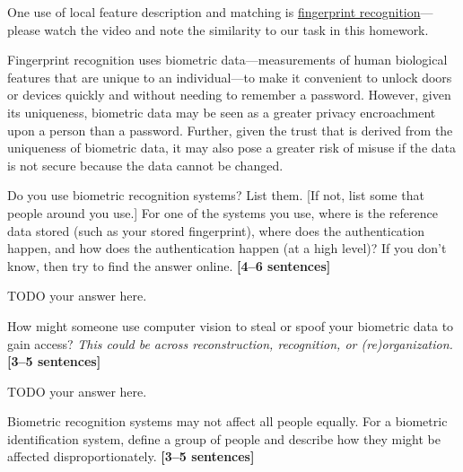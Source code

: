 \documentclass{csci1430}
\begin{document}
\begin{question}[points=9,drawbox=false] 
One use of local feature description and matching is \href{https://youtu.be/xD88Qs_DZp4?t=11}{fingerprint recognition}---please watch the video and note the similarity to our task in this homework. 

Fingerprint recognition uses biometric data---measurements of human biological features that are unique to an individual---to make it convenient to unlock doors or devices quickly and without needing to remember a password. However, given its uniqueness, biometric data may be seen as a greater privacy encroachment upon a person than a password. Further, given the trust that is derived from the uniqueness of biometric data, it may also pose a greater risk of misuse if the data is not secure because the data cannot be changed.
\end{question}

\begin{subquestion}[points=3]
Do you use biometric recognition systems? List them. [If not, list some that people around you use.]
For one of the systems you use, where is the reference data stored (such as your stored fingerprint), where does the authentication happen, and how does the authentication happen (at a high level)? 
If you don't know, then try to find the answer online. \textbf{[4--6 sentences]}
\end{subquestion}
    
\begin{answer}[height=14]
TODO your answer here.
\end{answer}

\pagebreak

\begin{subquestion}[points=3]
How might someone use computer vision to steal or spoof your biometric data to gain access? \emph{This could be across reconstruction, recognition, or (re)organization.} \textbf{[3--5 sentences]}
\end{subquestion}

\begin{answer}[height=14]
TODO your answer here.
\end{answer}
    

\begin{subquestion}[points=3]
Biometric recognition systems may not affect all people equally. For a biometric identification system, define a group of people and describe how they might be affected disproportionately. \textbf{[3--5 sentences]}
\end{subquestion}
    
\end{document}
